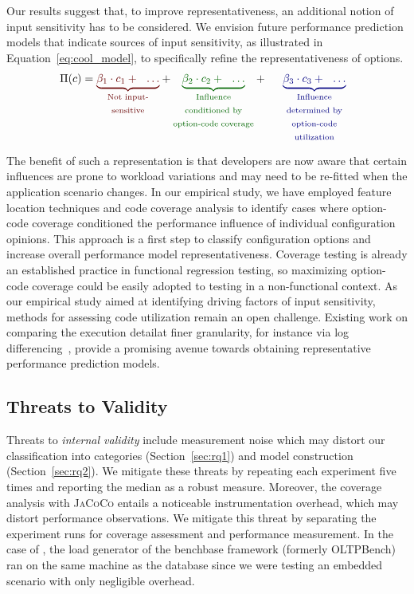 Our results suggest that, to improve representativeness, an additional notion of input sensitivity has to be considered. We envision future performance prediction models that indicate sources of input sensitivity, as illustrated in Equation~\ref{eq:cool_model}, to specifically refine the representativeness of options.
\begin{equation}
	\Pi(c) = {\color{red!40!black}
		\underbrace{\beta_1 \cdot c_1 + ~~\ldots}_{\text{\parbox{1.4cm}{\centering Not input-sensitive}}}
	} + {\color{green!40!black}
		\underbrace{\beta_2 \cdot c_2 +  ~~\ldots}_{\text{\parbox{2.55cm}{\centering Influence conditioned by option-code coverage}}}
	} + ~~
	{\color{blue!50!black}
		\underbrace{\beta_3 \cdot c_3 + ~~\ldots}_{\text{\parbox{2.5cm}{\centering Influence determined by option-code utilization}}}
	}
	\label{eq:cool_model}
\end{equation}

The benefit of such a representation is that developers are now aware that certain influences are prone to workload variations and may need to be re-fitted when the application scenario changes.
In our empirical study, we have employed feature location techniques and code coverage analysis to identify cases where option-code coverage conditioned the performance influence of individual configuration opinions. This approach is a first step to classify configuration options and increase overall performance model representativeness. Coverage testing is already an established practice in functional regression testing, so maximizing option-code coverage could be easily adopted to testing in a non-functional context. 
As our empirical study aimed at identifying driving factors of input sensitivity, methods for assessing code utilization remain an open challenge. Existing work on comparing the execution detailat finer granularity, for instance via log differencing~\cite{bao_logdiff_ase_2019}, provide a promising avenue towards obtaining representative performance prediction models.

\subsection{Threats to Validity}\label{sec:threats}
Threats to \emph{internal validity} include measurement noise which may distort our classification into categories (Section~\ref{sec:rq1}) and model construction (Section~\ref{sec:rq2}). We mitigate these threats by repeating each experiment five times and reporting the median as a robust measure. %
Moreover, the coverage analysis with \mbox{\textsc{JaCoCo}} entails a noticeable instrumentation overhead, which may distort performance observations. We mitigate this threat by separating the experiment runs for coverage assessment and performance measurement. In the case of \htwo, the load generator of the \textsf{benchbase} framework (formerly \textsf{OLTPBench})~\cite{difallah_oltp_2013} ran on the same machine as the database since we were testing an embedded scenario with only negligible overhead.

